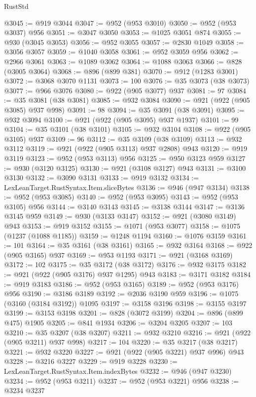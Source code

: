 \begin{lexlean}{RustStd}
\begin{coremodule}
@3045 := @919 @3044
@3047 := @952 (@953 @3010)
@3050 := @952 (@953 @3037) @956
@3051 := @3047 @3050
@3053 := @1025 @3051 @874
@3055 := @930 (@3045 @3053)
@3056 := @952 @3055
@3057 := @2830 @1049
@3058 := @3056 @3057
@3059 := @1040 @3058
@3061 := @952 @3059 @956
@3062 := @2966 @3061
@3063 := @1089 @3062
@3064 := @1088 @3063
@3066 := @828 (@3005 @3064)
@3068 := @896 (@899 @381)
@3070 := @912 (@1283 @3001)
@3072 := @3068 @3070 @1131
@3073 := 100
@3076 := @35 @3073 (@38 @3073)
@3077 := @966 @3076
@3080 := @922 (@905 @3077) @937
@3081 := 97
@3084 := @35 @3081 (@38 @3081)
@3085 := @932 @3084
@3090 := @921 (@922 (@905 @3085) @937 @998)
@3091 := 98
@3094 := @35 @3091 (@38 @3091)
@3095 := @932 @3094
@3100 := @921 (@922 (@905 @3095) @937 @1937)
@3101 := 99
@3104 := @35 @3101 (@38 @3101)
@3105 := @932 @3104
@3108 := @922 (@905 @3105) @937
@3109 := 96
@3112 := @35 @3109 (@38 @3109)
@3113 := @932 @3112
@3119 := @921 (@922 (@905 @3113) @937 @2808) @943
@3120 := @919 @3119
@3123 := @952 (@953 @3113) @956
@3125 := @950 @3123 @959
@3127 := @930 (@3120 @3125)
@3130 := @921 (@3108 @3127) @943
@3131 := @3100 @3130
@3132 := @3090 @3131
@3133 := @919 @3132
@3134 := LexLeanTarget.RustSyntax.Item.sliceBytes
@3136 := @946 (@947 @3134)
@3138 := @952 (@953 @3085)
@3140 := @952 (@953 @3095)
@3143 := @952 (@953 @3105) @956
@3144 := @3140 @3143
@3145 := @3138 @3144
@3147 := @3136 @3145 @959
@3149 := @930 (@3133 @3147)
@3152 := @921 (@3080 @3149) @943
@3153 := @919 @3152
@3155 := @1071 (@953 @3077)
@3158 := @1075 (@1237 (@1088 @1185))
@3159 := @1248 @1194
@3160 := @1076 @3159
@3161 := 101
@3164 := @35 @3161 (@38 @3161)
@3165 := @932 @3164
@3168 := @922 (@905 @3165) @937
@3169 := @953 @1193
@3171 := @921 (@3168 @3169)
@3172 := 102
@3175 := @35 @3172 (@38 @3172)
@3176 := @932 @3175
@3182 := @921 (@922 (@905 @3176) @937 @1295) @943
@3183 := @3171 @3182
@3184 := @919 @3183
@3186 := @952 (@953 @3165)
@3189 := @952 (@953 @3176) @956
@3190 := @3186 @3189
@3192 := @2036 @3190 @959
@3196 := @1075 (@3160 (@3184 @3192)) @1095
@3197 := @3158 @3196
@3198 := @3155 @3197
@3199 := @3153 @3198
@3201 := @828 (@3072 @3199)
@3204 := @896 (@899 @475) @1905
@3205 := @841 @1934
@3206 := @3204 @3205
@3207 := 103
@3210 := @35 @3207 (@38 @3207)
@3211 := @932 @3210
@3216 := @921 (@922 (@905 @3211) @937 @998)
@3217 := 104
@3220 := @35 @3217 (@38 @3217)
@3221 := @932 @3220
@3227 := @921 (@922 (@905 @3221) @937 @996) @943
@3228 := @3216 @3227
@3229 := @919 @3228
@3230 := LexLeanTarget.RustSyntax.Item.indexBytes
@3232 := @946 (@947 @3230)
@3234 := @952 (@953 @3211)
@3237 := @952 (@953 @3221) @956
@3238 := @3234 @3237

\end{coremodule}
\end{lexlean}
